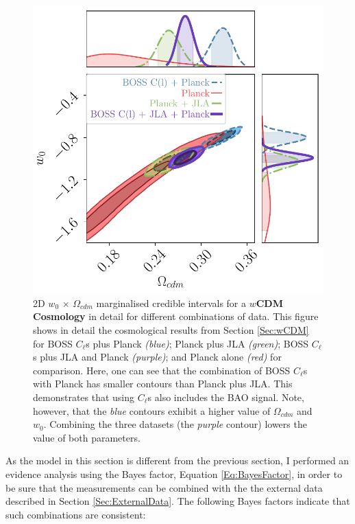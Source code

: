 \begin{figure}
\begin{center}
\includegraphics[scale=0.85]{BOSS-FIGS/w0_Ocdm_Thesis2.pdf}
\caption[2D $w_0 \, \times \, \Omega_{cdm}$ marginalised credible intervals for a $w$CDM Cosmology in details.]{2D $w_0 \, \times \, \Omega_{cdm}$ marginalised credible intervals for a \textbf{$w$CDM Cosmology} in detail for different combinations of data. This figure shows in detail the cosmological results from Section \ref{Sec:wCDM} for BOSS $C_{\ell}$s plus Planck \textit{(blue)}; Planck plus JLA \textit{(green)}; BOSS $C_{\ell}$s plus JLA and Planck \textit{(purple)}; and Planck alone \textit{(red)} for comparison. Here, one can see that the combination of BOSS $C_{\ell}$s with Planck has smaller contours than Planck plus JLA. This demonstrates that using $C_{\ell}$s also includes the BAO signal. Note, however, that the \textit{blue} contours exhibit a higher value of $\Omega_{cdm}$ and $w_0$. Combining the three datasets (the \textit{purple} contour) lowers the value of both parameters.}
\label{fig:Om_w0_wCDM2}
\end{center}
\end{figure}

\qquad As the model in this section is different from the previous section, I performed an evidence analysis using the Bayes factor, Equation \eqref{Eq:BayesFactor}, in order to be sure that the measurements can be combined with the the external data described in Section \ref{Sec:ExternalData}. The following Bayes factors indicate that such combinations are consistent:


